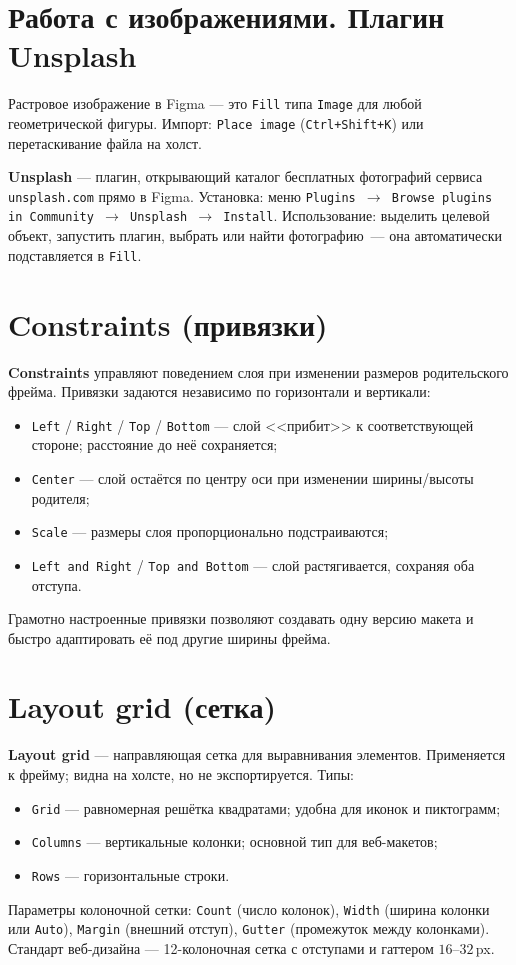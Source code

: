 \section{Работа с изображениями. Плагин Unsplash}

Растровое изображение в Figma — это \texttt{Fill} типа \texttt{Image}
для любой геометрической фигуры. Импорт: \texttt{Place~image}
(\texttt{Ctrl+Shift+K}) или перетаскивание файла на холст.

\textbf{Unsplash} — плагин, открывающий каталог бесплатных фотографий
сервиса \texttt{unsplash.com} прямо в Figma. Установка: меню
\texttt{Plugins~\(\rightarrow\)~Browse plugins in Community~\(\rightarrow\)
Unsplash~\(\rightarrow\)~Install}. Использование: выделить целевой
объект, запустить плагин, выбрать или найти фотографию~--- она
автоматически подставляется в \texttt{Fill}.

\section{Constraints (привязки)}

\textbf{Constraints} управляют поведением слоя при изменении размеров
родительского фрейма. Привязки задаются независимо по горизонтали и
вертикали:
\begin{itemize}
  \item \texttt{Left} / \texttt{Right} / \texttt{Top} / \texttt{Bottom} ---
        слой <<прибит>> к соответствующей стороне; расстояние до неё
        сохраняется;
  \item \texttt{Center} — слой остаётся по центру оси при изменении
        ширины/высоты родителя;
  \item \texttt{Scale} — размеры слоя пропорционально подстраиваются;
  \item \texttt{Left and Right} / \texttt{Top and Bottom} — слой
        растягивается, сохраняя оба отступа.
\end{itemize}
Грамотно настроенные привязки позволяют создавать одну версию макета
и быстро адаптировать её под другие ширины фрейма.

\section{Layout grid (сетка)}

\textbf{Layout grid} — направляющая сетка для выравнивания элементов.
Применяется к фрейму; видна на холсте, но не экспортируется. Типы:
\begin{itemize}
  \item \texttt{Grid} — равномерная решётка квадратами; удобна для
        иконок и пиктограмм;
  \item \texttt{Columns} — вертикальные колонки; основной тип для
        веб-макетов;
  \item \texttt{Rows} — горизонтальные строки.
\end{itemize}
Параметры колоночной сетки: \texttt{Count} (число колонок),
\texttt{Width} (ширина колонки или \texttt{Auto}), \texttt{Margin}
(внешний отступ), \texttt{Gutter} (промежуток между колонками).
Стандарт веб-дизайна — 12-колоночная сетка с отступами и гаттером
\(16\text{--}32\,\)px.

